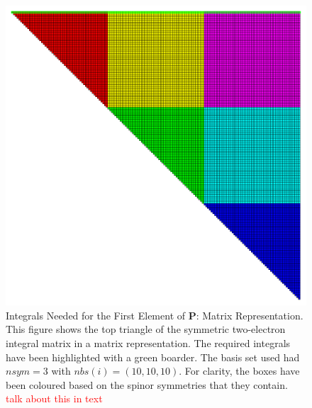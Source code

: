 \documentclass[12pt]{report}
\newcommand{\notetodylan}[1]{\textcolor{red}{#1}} %
\begin{document}
\begin{figure}
\includegraphics[width=1\textwidth]{Figures/eint2_mat_lots.png}
\caption[Integrals Needed for the First Element of \textbf{P}: Matrix Representation]
{Integrals Needed for the First Element of \textbf{P}: Matrix Representation. This figure shows the top triangle of the symmetric two-electron integral matrix in a matrix representation. The required integrals have been highlighted with a green boarder. The basis set used had $nsym=3$ with $nbs(i) = (10, 10, 10)$. For clarity, the boxes have been coloured based on the spinor symmetries that they contain. \notetodylan{talk about this in text}}
\label{fig:eint2matlots}
\end{figure}
\end{document}
